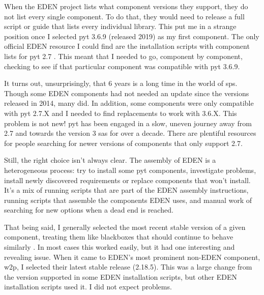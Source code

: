 \documentclass[a4paper,man,natbib,floatsintext]{apa6}
\begin{document}
  When the \gls{EDEN} project lists what component versions they support, they do not list every single component. To do that, they would need to release a full script or guide that lists every individual library. This put me in a strange position once I selected \Gls{pyt} 3.6.9 (released 2019) as my first component. The only official \gls{EDEN} resource I could find are the installation scripts with component lists for \Gls{pyt} 2.7 \citep{Sahana_Foundation2018-eq}. This meant that I needed to go, component by component, checking to see if that particular component was compatible with \Gls{pyt} 3.6.9.

  It turns out, unsurprisingly, that 6 years is a long time in the world of \glspl{sp}. Though some \gls{EDEN} components had not needed an update since the versions released in 2014, many did. In addition, some components were only compatible with \Gls{pyt} 2.7.X and I needed to find replacements to work with 3.6.X. This problem is not new! \Gls{pyt} has been engaged in a slow, uneven journey away from 2.7 and towards the version 3 \glspl{sa} for over a decade. There are plentiful resources for people searching for newer versions of components that only support 2.7.

  Still, the right choice isn't always clear. The assembly of \gls{EDEN} is a heterogeneous process: try to install some \Gls{pyt} components, investigate problems, install newly discovered requirements or replace components that won't install. It's a mix of running scripts that are part of the \gls{EDEN} assembly instructions, running scripts that assemble the components \gls{EDEN} uses, and manual work of searching for new options when a dead end is reached.

  That being said, I generally selected the most recent stable version of a given component, treating them like blackboxes that should continue to behave similarly \citep{Latour1999-ui}. In most cases this worked easily, but it had one interesting and revealing issue. When it came to \gls{EDEN}'s most prominent non-\gls{EDEN} component, \gls{w2p}, I selected their latest stable release (2.18.5). This was a large change from the version supported in some \gls{EDEN} installation scripts, but other \gls{EDEN} installation scripts used it\footnotemark. I did not expect problems.

\end{document}
